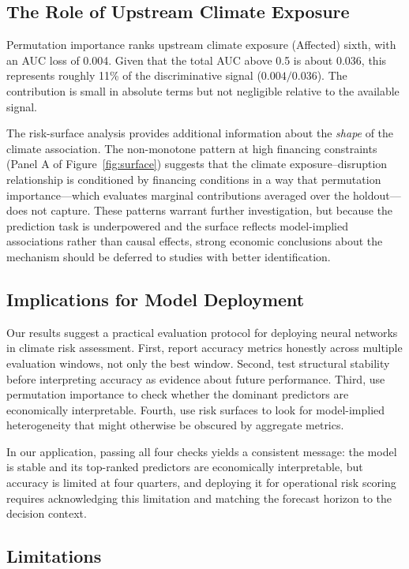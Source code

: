 \documentclass[12pt]{article}
\begin{document}
\subsection{The Role of Upstream Climate Exposure}

Permutation importance ranks upstream climate exposure (Affected) sixth,
with an AUC loss of 0.004.  Given that the total AUC above 0.5 is about
0.036, this represents roughly 11\% of the discriminative signal
($0.004 / 0.036$).  The contribution is small in absolute terms but not
negligible relative to the available signal.

The risk-surface analysis provides additional information about the
\emph{shape} of the climate association.  The non-monotone pattern at high
financing constraints (Panel A of Figure~\ref{fig:surface}) suggests that
the climate exposure--disruption relationship is conditioned by financing
conditions in a way that permutation importance---which evaluates marginal
contributions averaged over the holdout---does not capture.  These patterns
warrant further investigation, but because the prediction task is underpowered
and the surface reflects model-implied associations rather than causal effects,
strong economic conclusions about the mechanism should be deferred to
studies with better identification.

\subsection{Implications for Model Deployment}

Our results suggest a practical evaluation protocol for deploying neural
networks in climate risk assessment.  First, report accuracy metrics
honestly across multiple evaluation windows, not only the best window.
Second, test structural stability before interpreting accuracy as evidence
about future performance.  Third, use permutation importance to check
whether the dominant predictors are economically interpretable.  Fourth,
use risk surfaces to look for model-implied heterogeneity that might
otherwise be obscured by aggregate metrics.

In our application, passing all four checks yields a consistent message:
the model is stable and its top-ranked predictors are economically
interpretable, but accuracy is limited at four quarters, and deploying it
for operational risk scoring requires acknowledging this limitation and
matching the forecast horizon to the decision context.

\subsection{Limitations}
\end{document}
